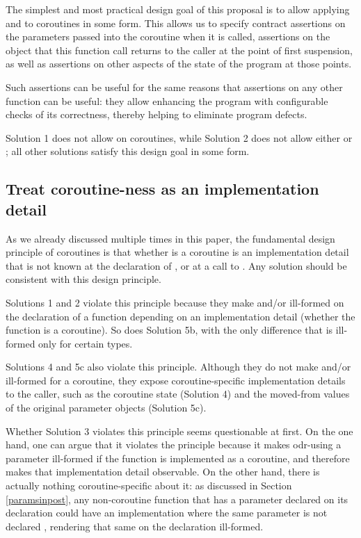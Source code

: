 The simplest and most practical design goal of this proposal is to allow applying  and  to coroutines in some form. This allows us to specify contract assertions on the parameters passed into the coroutine when it is called, assertions on the object that this function call returns to the caller at the point of first suspension, as well as assertions on other aspects of the state of the program at those points.

Such assertions can be useful for the same reasons that assertions on any other function can be useful: they allow enhancing the program with configurable checks of its correctness, thereby helping to eliminate program defects.

Solution 1 does not allow  on coroutines, while Solution 2 does not allow either  or ; all other solutions satisfy this design goal in some form.

\subsection{Treat coroutine-ness as an implementation detail}

As we already discussed multiple times in this paper, the fundamental design principle of coroutines is that whether  is a coroutine is an implementation detail that is not known at the declaration of , or at a call to . Any solution should be consistent with this design principle.

Solutions 1 and 2 violate this principle because they make  and/or  ill-formed on the declaration of a function depending on an implementation detail (whether the function is a coroutine). So does Solution 5b, with the only difference that  is ill-formed only for certain types. 

Solutions 4 and 5c also violate this principle. Although they do not make  and/or  ill-formed for a coroutine, they expose coroutine-specific implementation details to the caller, such as the coroutine state (Solution 4) and the moved-from values of the original parameter objects (Solution 5c).

Whether Solution 3 violates this principle seems questionable at first. On the one hand, one can argue that it violates the principle because it makes odr-using a  parameter ill-formed if the function is implemented as a coroutine, and therefore makes that implementation detail observable. On the other hand, there is actually nothing coroutine-specific about it: as discussed in Section \ref{paramsinpost}, any non-coroutine function that has a parameter declared  on its declaration could have an implementation where the same parameter is not declared , rendering that same  on the declaration ill-formed.

